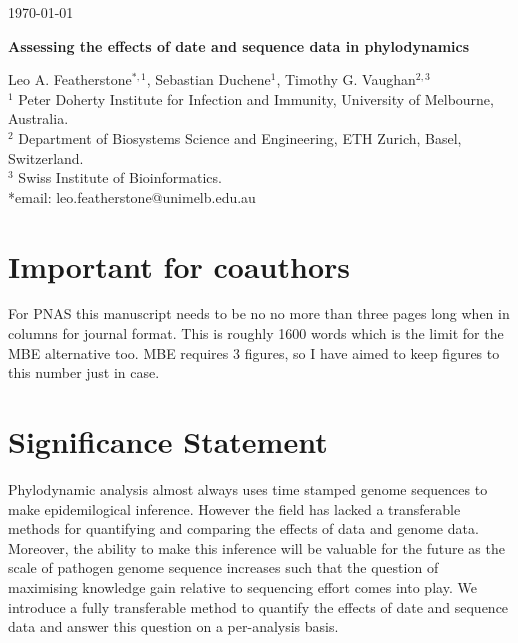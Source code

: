 \documentclass{article}
\begin{document}
\begin{flushright}
\today
\end{flushright}
\begin{center}
\begin{LARGE}
    \textbf{Assessing the effects of date and sequence data in phylodynamics}
\end{LARGE}
\end{center}
Leo A. Featherstone$^{\ast,1}$, Sebastian Duchene$^1$, Timothy G. Vaughan$^{2,3}$\\
$^{1}$ Peter Doherty Institute for Infection and Immunity, University of Melbourne, Australia.\\
$^{2}$ Department of Biosystems Science and Engineering, ETH Zurich, Basel, Switzerland.\\
$^{3}$  Swiss Institute of Bioinformatics.\\
*email: leo.featherstone@unimelb.edu.au
\section*{Important for coauthors}
For PNAS this manuscript needs to be no no more than three pages long when in columns for journal format. This is roughly 1600 words which is the limit for the MBE alternative too. MBE requires 3 figures, so I have aimed to keep figures to this number just in case.
\section*{Significance Statement}
Phylodynamic analysis almost always uses time stamped genome sequences to make epidemilogical inference. However the field has lacked a transferable methods for quantifying and comparing the effects of data and genome data. Moreover, the ability to make this inference will be valuable for the future as the scale of pathogen genome sequence increases such that the question of maximising knowledge gain relative to sequencing effort comes into play. We introduce a fully transferable method to quantify the effects of date and sequence data and answer this question on a per-analysis basis.
\end{document}
